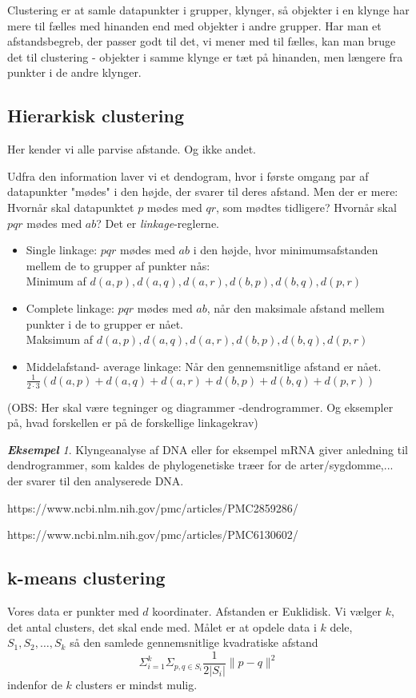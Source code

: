 \documentclass[a4paper, 12pt]{article}
\theoremstyle{remark}
\newtheorem{Eksempel}{\textbf{Eksempel}}
\begin{document}
Clustering er at samle datapunkter i grupper, klynger, så objekter i en klynge har mere til fælles med hinanden end med objekter i andre grupper. Har man et afstandsbegreb, der passer godt til det, vi mener med til fælles, kan man bruge det til clustering - objekter i samme klynge er tæt på hinanden, men længere fra punkter i de andre klynger. 
\subsection*{Hierarkisk clustering}
Her kender vi alle parvise afstande. Og ikke andet. 

Udfra den information laver vi et dendogram, hvor i første omgang par af datapunkter "mødes"\; i den højde, der svarer til deres afstand. Men der er mere: Hvornår skal datapunktet $p$ mødes med $qr$, som mødtes tidligere? Hvornår skal $pqr$ mødes med $ab$?  Det er \emph{linkage}-reglerne.
\begin{itemize}
\item Single linkage: $pqr$ mødes med $ab$ i den højde, hvor minimumsafstanden mellem de to grupper af punkter nås:\\ Minimum af $d(a,p),d(a,q), d(a,r), d(b,p), d(b,q), d(p,r)$
\item Complete linkage: $pqr$ mødes med $ab$, når den maksimale afstand mellem punkter i de to grupper er nået. \\Maksimum af $d(a,p),d(a,q), d(a,r), d(b,p), d(b,q), d(p,r)$
\item Middelafstand- average linkage: Når den gennemsnitlige afstand er nået. $\frac{1}{2\cdot 3}(d(a,p)+d(a,q)+ d(a,r)+ d(b,p)+ d(b,q)+ d(p,r))$
\end{itemize}
(OBS: Her skal være tegninger og diagrammer -dendrogrammer. Og eksempler på, hvad forskellen er på de forskellige linkagekrav)

\begin{Eksempel} Klyngeanalyse af DNA eller for eksempel mRNA giver anledning til dendrogrammer, som kaldes de phylogenetiske træer for de arter/sygdomme,... der svarer til den analyserede DNA. 

https://www.ncbi.nlm.nih.gov/pmc/articles/PMC2859286/

https://www.ncbi.nlm.nih.gov/pmc/articles/PMC6130602/
\end{Eksempel}
\subsection*{k-means clustering}
 Vores data er punkter med $d$ koordinater. Afstanden er Euklidisk. Vi vælger $k$, det antal clusters, det skal ende med. Målet er at opdele data i $k$ dele, $S_1, S_2,\ldots , S_k$ så den samlede gennemsnitlige kvadratiske afstand $$\Sigma_{i=1}^{k}\Sigma_{p,q\in S_i}\frac{1}{2|S_i|}\|p-q\|^2$$ indenfor de $k$ clusters er mindst mulig. 
\end{document}
